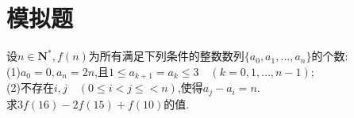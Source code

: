\documentclass[]{article}
\title{}
\author{}
\date{}
\begin{document}
\maketitle
\section{模拟题}{
设$n \in \mathbf{N^*},f(n)$为所有满足下列条件的整数数列$\{ a_0,a_1,…,a_n\}$的个数:\\
(1)$a_0=0,a_n=2n$,且$1\leq a_{k+1}=a_{k}\leq 3\quad(k=0,1,…,n-1)$;\\
(2)不存在$i,j \quad(0\leq i<j\leq <n)$,使得$a_j-a_i=n$.\\
求$3f(16)-2f(15)+f(10)$的值.
}
\iffalse

构造2×n的数表计数证明.
\fi 
\end{document}
